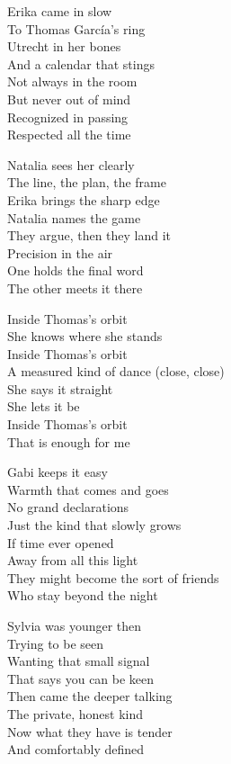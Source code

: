 \begin{lyrics}
Erika came in slow\\
To Thomas García's ring\\
Utrecht in her bones\\
And a calendar that stings\\
Not always in the room\\
But never out of mind\\
Recognized in passing\\
Respected all the time

Natalia sees her clearly\\
The line, the plan, the frame\\
Erika brings the sharp edge\\
Natalia names the game\\
They argue, then they land it\\
Precision in the air\\
One holds the final word\\
The other meets it there

Inside Thomas's orbit\\
She knows where she stands\\
Inside Thomas's orbit\\
A measured kind of dance
(close, close)\\
She says it straight\\
She lets it be\\
Inside Thomas's orbit\\
That is enough for me

Gabi keeps it easy\\
Warmth that comes and goes\\
No grand declarations\\
Just the kind that slowly grows\\
If time ever opened\\
Away from all this light\\
They might become the sort of friends\\
Who stay beyond the night

Sylvia was younger then\\
Trying to be seen\\
Wanting that small signal\\
That says you can be keen\\
Then came the deeper talking\\
The private, honest kind\\
Now what they have is tender\\
And comfortably defined


\end{lyrics}
